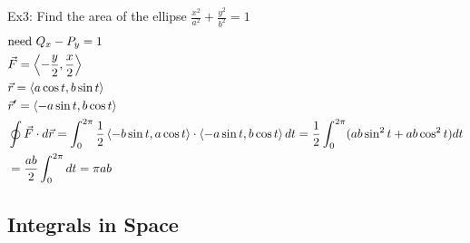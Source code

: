 \documentclass[11pt, fleqn]{article}
\begin{document}
Ex3: Find the area of the ellipse $\frac{x^2}{a^2}+\frac{y^2}{b^2}=1$
\begin{align*}
    &\text{need }Q_x-P_y=1\\
    &\vec{F}=\left\langle -\frac{y}{2},\frac{x}{2} \right\rangle\\
    &\vec{r}=\left\langle a\cos t,b\sin t \right\rangle\\
    &\vec{r}'=\left\langle -a\sin t,b\cos t \right\rangle\\
    &\oint\vec{F}\cdot d\vec{r}=\int_0^{2\pi}\frac{1}{2}\left\langle -b\sin t,a\cos t \right\rangle\cdot\left\langle -a\sin t,b\cos t \right\rangle dt=\frac{1}{2}\int_0^{2\pi}(ab\sin^2t+ab\cos^2t)dt\\
    &=\frac{ab}{2}\int_0^{2\pi}dt=\pi ab
\end{align*}












\subsection{Integrals in Space}
\end{document}
